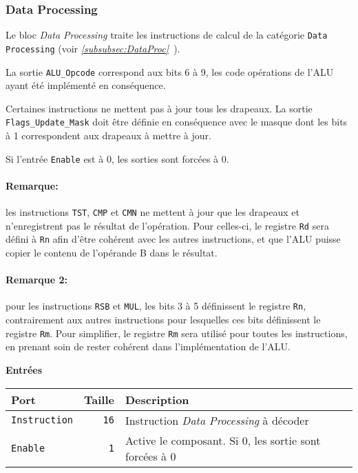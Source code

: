 \subsubsection{Data Processing}


Le bloc \textit{Data Processing} traite les instructions de calcul de la catégorie \texttt{Data Processing} (voir \textit{\ref{subsubsec:DataProc}~}).

La sortie \texttt{ALU\_Opcode} correspond aux bits 6 à 9, les code opérations de l'ALU ayant été implémenté en conséquence.

Certaines instructions ne mettent pas à jour tous les drapeaux. La sortie \texttt{Flags\_Update\_Mask} doit être définie en conséquence avec le masque dont les bits à 1 correspondent aux drapeaux à mettre à jour.

Si l'entrée \texttt{Enable} est à 0, les sorties sont forcées à 0.

\paragraph{Remarque:} les instructions \texttt{TST}, \texttt{CMP} et \texttt{CMN} ne mettent à jour que les drapeaux et n'enregistrent pas le résultat de l'opération.
Pour celles-ci, le registre \texttt{Rd} sera défini à \texttt{Rn} afin d'être cohérent avec les autres instructions, et que l'ALU puisse copier le contenu de l'opérande B dans le résultat.


\paragraph{Remarque 2:} pour les instructions \texttt{RSB} et \texttt{MUL}, les bits 3 à 5 définissent le registre \texttt{Rn}, contrairement aux autres instructions pour lesquelles ces bits définissent le registre \texttt{Rm}.
Pour simplifier, le registre \texttt{Rm} sera utilisé pour toutes les instructions, en prenant soin de rester cohérent dans l'implémentation de l'ALU.



\textbf{Entrées}\\

\begin{tabular}{|l|r|l|}
\hline
\textbf{Port}		& \textbf{Taille} & \textbf{Description}\\
\hline

\texttt{Instruction}	& \texttt{16} & Instruction \textit{Data Processing} à décoder\\
\hline
\texttt{Enable}		&  \texttt{1} & Active le composant. Si 0, les sortie sont forcées à 0\\


\hline
\end{tabular}


